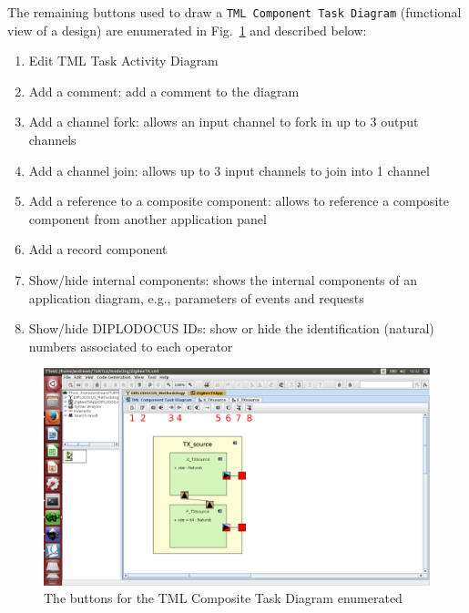 \documentclass{llncs}
\newcommand{\screenshotsize}{1.0\textwidth}
\begin{document}
%
The remaining buttons used to draw a \texttt{TML Component Task Diagram} (functional view of a design) are enumerated in
Fig.~\ref{fig:Buttons1} and described below:
%
\begin{enumerate}
	\item Edit TML Task Activity Diagram
	\item Add a comment: add a comment to the diagram
	\item Add a channel fork: allows an input channel to fork in up to 3 output channels
	\item Add a channel join: allows up to 3 input channels to join into 1 channel
	\item Add a reference to a composite component: allows to reference a composite component from another
	application panel
	\item Add a record component
	\item Show/hide internal components: shows the internal components of an application diagram, e.g., parameters
	of events and requests
	\item Show/hide DIPLODOCUS IDs: show or hide the identification (natural) numbers associated to each operator
\end{enumerate}
%
\begin{figure}[!htbp]
	\centering
	\includegraphics[width=\screenshotsize]{figures/screenshot/Buttons1.pdf}
	\caption{The buttons for the TML Composite Task Diagram enumerated}
	\label{fig:Buttons1}
\end{figure}
%
\end{document}

